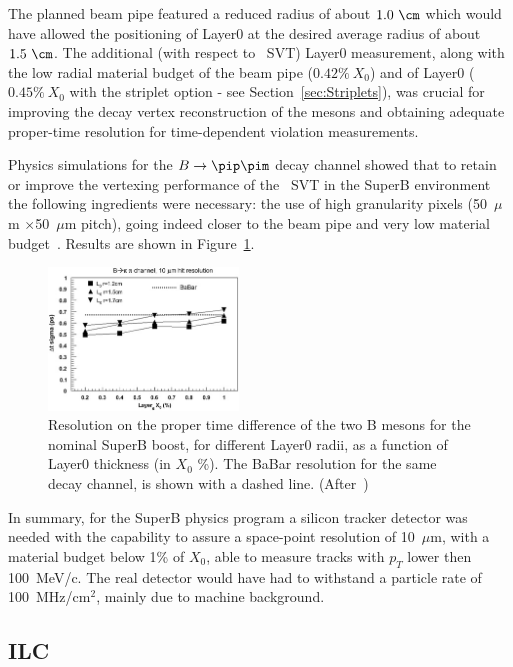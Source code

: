 The planned beam pipe featured a reduced radius of about $1.0~\cm$  which would have allowed
 the positioning of 
Layer0 at
the desired average radius of about $1.5~\cm$. The additional  (with respect to \babar\ SVT) 
 Layer0 measurement,
along with the low radial material budget of the beam pipe ($0.42\%~X_0$)
and of Layer0 ($0.45\%~X_0$ with the striplet option - see Section~\ref{sec:Striplets}),
was crucial for improving the decay vertex reconstruction of the \B mesons and
 obtaining adequate proper-time resolution for time-dependent \CP violation measurements.

Physics simulations for the $B\to\pip\pim$ decay channel showed that to retain or improve the vertexing performance of the \babar\ SVT in the SuperB environment the following ingredients were necessary: the use of high granularity pixels (50~$\mu$m $\times$50~$\mu$m pitch), going indeed closer to the beam pipe and very low material budget~\cite{RIZZO2010585}. Results are shown in 
Figure~\ref{fig:bpipi}. 

\begin{figure}
\centering
\includegraphics[width=0.45\textwidth]{bpipi}
\caption{\label{fig:bpipi} Resolution on the proper time difference of the two B mesons for the nominal SuperB boost, for different Layer0 radii, as a function of Layer0 thickness (in $X_0$ \%). The BaBar resolution for the same decay channel, is shown with a dashed line. (After~\cite{RIZZO2010585})}
\end{figure}

In summary, for the SuperB physics program a silicon tracker detector was needed with the 
capability to assure a space-point resolution of 10~$\mu$m, with a material budget below 
1\% of $X_0$, able to measure tracks with $p_T$ lower then 100~MeV/c. The real detector 
would have had to withstand a particle rate of 100~MHz/cm$^2$, mainly due to machine 
background.

\subsection{ILC}

